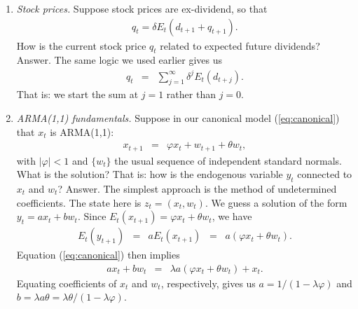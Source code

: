 \documentclass[11pt]{article}
\begin{document}
\begin{enumerate}
\item {\it Stock prices.\/}
Suppose stock prices are ex-dividend, so that
\begin{eqnarray*}
    q_t = \delta E_t (d_{t+1} + q_{t+1}) .
\end{eqnarray*}
How is the current stock price $q_t$ related to expected future
dividends?
%
Answer. The same logic we used earlier gives us
\begin{eqnarray*}
    q_t &=&  \sum_{j=1}^\infty \delta^j E_t (d_{t+j}) .
\end{eqnarray*}
That is:  we start the sum at $j=1$ rather than $j=0$.

\item {\it ARMA(1,1) fundamentals.\/}
Suppose in our canonical model (\ref{eq:canonical}) that
$x_t$ is ARMA(1,1):
\begin{eqnarray*}
    x_{t+1} &=& \varphi x_t + w_{t+1} + \theta w_t ,
\end{eqnarray*}
with $| \varphi| < 1$ and $\{ w_t \}$ the usual sequence of independent
standard normals.
What is the solution?
That is:  how is the endogenous variable $y_t$ connected to $x_t$ and $w_t$?
%
Answer.
The simplest approach is the method of undetermined coefficients.
The state here is $z_t = (x_t, w_t)$.
We guess a solution of the form
$ y_t = a x_t + b w_t $.
Since $ E_t (x_{t+1}) = \varphi x_t + \theta w_t $,
we have
\begin{eqnarray*}
    E_t (y_{t+1}) &=& a E_t (x_{t+1})
            \;\;=\;\; a (\varphi x_t + \theta w_t ).
\end{eqnarray*}
Equation (\ref{eq:canonical}) then implies
\begin{eqnarray*}
        a x_t + b w_t &=& \lambda a (\varphi x_t + \theta w_t ) + x_t .
\end{eqnarray*}
Equating coefficients of $x_t$ and $w_t$, respectively,
gives us $a = 1/(1-\lambda\varphi)$ and
$b = \lambda a \theta = \lambda \theta /(1-\lambda\varphi)$.



\end{enumerate}
\end{document}
